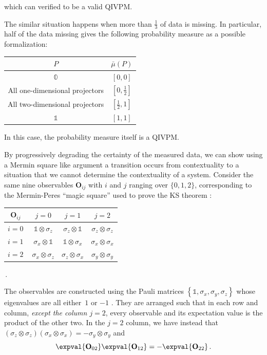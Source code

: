 \documentclass[english,reprint, aps, prl,superscriptaddress, showpacs,
showkeys, longbibliography, amsmath, amssymb, floatfix]{revtex4-1}
\theoremstyle{plain}
\theoremstyle{definition}
\newcommand{\imposs}{\ensuremath{\left[0,0\right]}}
\newcommand{\necess}{\ensuremath{\left[1,1\right]}}
\begin{document}
\noindent which can verified to be a valid QIVPM.

The similar situation happens when more than $\frac{1}{3}$ of data
is missing. In particular, half of the data missing gives the following
probability measure as a possible formalization:
\begin{center}
\begin{tabular}{cc}
\toprule 
\addlinespace
$P$  & $\bar{\mu}\left(P\right)$\tabularnewline
\midrule
\midrule 
\addlinespace
$\mathbb{0}$ & $\imposs$\tabularnewline
\midrule 
\addlinespace
All one-dimensional projectors & $\left[0,\tfrac{1}{2}\right]$\tabularnewline
\midrule 
\addlinespace
All two-dimensional projectors & $\left[\tfrac{1}{2},1\right]$\tabularnewline
\midrule 
\addlinespace
$\mathbb{1}$ & $\necess$\tabularnewline
\bottomrule
\end{tabular}
\par\end{center}

\noindent In this case, the probability measure itself is a QIVPM.

By progressively degrading the certainty of the measured data, we
can show using a Mermin square like argument a transition occurs from
contextuality to a situation that we cannot determine the contextuality
of a system. Consider the same nine observables $\mathbf{O}_{ij}$
with $i$ and $j$ ranging over $\{0,1,2\}$, corresponding to the
Mermin-Peres ``magic square'' used to prove the KS theorem \cite{Mermin1990Simple,peres1995quantum,Griffiths2003}:


{\renewcommand{\arraystretch}{2}%
\begin{center} 
\begin{tabular}{r|@{\quad}c@{\quad}|@{\quad}c@{\quad}|@{\quad}c@{\quad}|} 
$\mathbf{O}_{ij}$~ & $j=0$ & $j=1$ & $j=2$ \\ 
\hline  
$i=0~$ & $\mathbb{1}\otimes\sigma_{z}$  & $\sigma_{z}\otimes\mathbb{1}$  & $\sigma_{z}\otimes\sigma_{z}$ \tabularnewline 
\hline  
$i=1~$ & $\sigma_{x}\otimes\mathbb{1}$  & $\mathbb{1}\otimes\sigma_{x}$  & $\sigma_{x}\otimes\sigma_{x}$ \tabularnewline 
\hline  
$i=2~$ & $\sigma_{x}\otimes\sigma_{z}$  & $\sigma_{z}\otimes\sigma_{x}$  & $\sigma_{y}\otimes\sigma_{y}$ \tabularnewline 
\hline  
\end{tabular}\,.
\par\end{center} 
}

\noindent The observables are constructed using the Pauli matrices
$\left\{ \mathbb{1},\sigma_{x},\sigma_{y},\sigma_{z}\right\} $ whose
eigenvalues are all either~$1$ or $-1$ \cite{Redhead1987-REDINA,544199,Griffiths2003,Jaeger2007,Mermin2007}.
They are arranged such that in each row and column, \emph{except the
column $j=2$}, every observable and its expectation value is the
product of the other two. In the $j=2$ column, we have instead that
$\left(\sigma_{z}\otimes\sigma_{z}\right)\left(\sigma_{x}\otimes\sigma_{x}\right)=-\sigma_{y}\otimes\sigma_{y}$
and 
\begin{equation}
\expval{\mathbf{O}_{02}}\expval{\mathbf{O}_{12}}=-\expval{\mathbf{O}_{22}}\,.\label{eq:j_2_expectation_value}
\end{equation}
\end{document}
